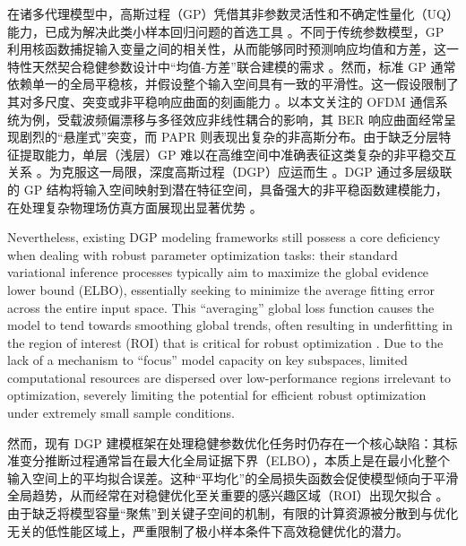 \documentclass[11pt]{article}
\begin{document}
在诸多代理模型中，高斯过程（GP）凭借其非参数灵活性和不确定性量化（UQ）能力，已成为解决此类小样本回归问题的首选工具 \citep{Williams2006, Deng2017, Joseph2019}。不同于传统参数模型，GP 利用核函数捕捉输入变量之间的相关性，从而能够同时预测响应均值和方差，这一特性天然契合稳健参数设计中“均值-方差”联合建模的需求 \citep{Gramacy2020, Wang2025}。然而，标准 GP 通常依赖单一的全局平稳核，并假设整个输入空间具有一致的平滑性。这一假设限制了其对多尺度、突变或非平稳响应曲面的刻画能力 \citep{Ko2022, Sauer2023, Tao2025}。以本文关注的 OFDM 通信系统为例，受载波频偏漂移与多径效应非线性耦合的影响，其 BER 响应曲面经常呈现剧烈的“悬崖式”突变，而 PAPR 则表现出复杂的非高斯分布。由于缺乏分层特征提取能力，单层（浅层）GP 难以在高维空间中准确表征这类复杂的非平稳交互关系 \citep{Zhai2022, Lin2024, WangX2025}。为克服这一局限，深度高斯过程（DGP）应运而生 \citep{Damianou2013}。DGP 通过多层级联的 GP 结构将输入空间映射到潜在特征空间，具备强大的非平稳函数建模能力，在处理复杂物理场仿真方面展现出显著优势 \citep{Muller2017, Ding2024}。

Nevertheless, existing DGP modeling frameworks still possess a core deficiency when dealing with robust parameter optimization tasks: their standard variational inference processes typically aim to maximize the global evidence lower bound (ELBO), essentially seeking to minimize the average fitting error across the entire input space. This ``averaging'' global loss function causes the model to tend towards smoothing global trends, often resulting in underfitting in the region of interest (ROI) that is critical for robust optimization \citep{Zhang2022}. Due to the lack of a mechanism to ``focus'' model capacity on key subspaces, limited computational resources are dispersed over low-performance regions irrelevant to optimization, severely limiting the potential for efficient robust optimization under extremely small sample conditions.

然而，现有 DGP 建模框架在处理稳健参数优化任务时仍存在一个核心缺陷：其标准变分推断过程通常旨在最大化全局证据下界（ELBO），本质上是在最小化整个输入空间上的平均拟合误差。这种“平均化”的全局损失函数会促使模型倾向于平滑全局趋势，从而经常在对稳健优化至关重要的感兴趣区域（ROI）出现欠拟合 \citep{Zhang2022}。由于缺乏将模型容量“聚焦”到关键子空间的机制，有限的计算资源被分散到与优化无关的低性能区域上，严重限制了极小样本条件下高效稳健优化的潜力。
\end{document}
